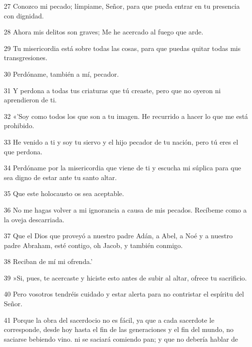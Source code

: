 \par 27 Conozco mi pecado; límpiame, Señor, para que pueda entrar en tu presencia con dignidad.

\par 28 Ahora mis delitos son graves; Me he acercado al fuego que arde.

\par 29 Tu misericordia está sobre todas las cosas, para que puedas quitar todas mis transgresiones.

\par 30 Perdóname, también a mí, pecador.

\par 31 Y perdona a todas tus criaturas que tú creaste, pero que no oyeron ni aprendieron de ti.

\par 32 «'Soy como todos los que son a tu imagen. He recurrido a hacer lo que me está prohibido.

\par 33 He venido a ti y soy tu siervo y el hijo pecador de tu nación, pero tú eres el que perdona.

\par 34 Perdóname por la misericordia que viene de ti y escucha mi súplica para que sea digno de estar ante tu santo altar.

\par 35 Que este holocausto os sea aceptable.

\par 36 No me hagas volver a mi ignorancia a causa de mis pecados. Recíbeme como a la oveja descarriada.

\par 37 Que el Dios que proveyó a nuestro padre Adán, a Abel, a Noé y a nuestro padre Abraham, esté contigo, oh Jacob, y también conmigo.

\par 38 Reciban de mí mi ofrenda.'

\par 39 »Si, pues, te acercaste y hiciste esto antes de subir al altar, ofrece tu sacrificio.

\par 40 Pero vosotros tendréis cuidado y estar alerta para no contristar el espíritu del Señor.

\par 41 Porque la obra del sacerdocio no es fácil, ya que a cada sacerdote le corresponde, desde hoy hasta el fin de las generaciones y el fin del mundo, no saciarse bebiendo vino. ni se saciará comiendo pan; y que no debería hablar de

